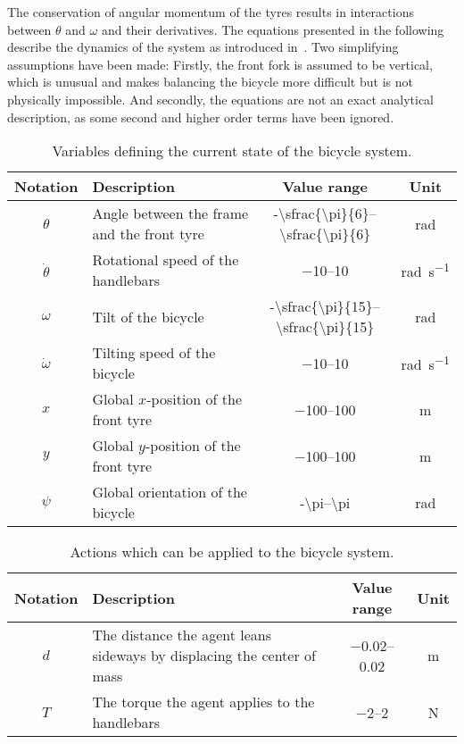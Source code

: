 The conservation of angular momentum of the tyres results in interactions between $\theta$ and $\omega$ and their derivatives.
The equations presented in the following describe the dynamics of the system as introduced in~\cite{randlov_learning_1998}.
Two simplifying assumptions have been made:
Firstly, the front fork is assumed to be vertical, which is unusual and makes balancing the bicycle more difficult but is not physically impossible.
And secondly, the equations are not an exact analytical description, as some second and higher order terms have been ignored.
\begin{table}[p]
    \centering
    \caption{Variables defining the current state of the bicycle system.}
    \label{tab:bicycle_variables}
    \begin{tabularx}{\tablewidth}{cXcc}
        \toprule
        Notation & Description & Value range & Unit \\
        \midrule
        $\theta$ & Angle between the frame and the front tyre & \numrange[parse-numbers=false]{-\sfrac{\pi}{6}}{\sfrac{\pi}{6}} & \si{\radian} \\
        $\dot{\theta}$ & Rotational speed of the handlebars & \numrange{-10}{10} & \si{\radian\per\second} \\
        $\omega$ & Tilt of the bicycle & \numrange[parse-numbers=false]{-\sfrac{\pi}{15}}{\sfrac{\pi}{15}} & \si{\radian} \\
        $\dot{\omega}$ & Tilting speed of the bicycle & \numrange{-10}{10} & \si{\radian\per\second} \\
        $x$ & Global $x$-position of the front tyre & \numrange{-100}{100} & \si{\metre} \\
        $y$ & Global $y$-position of the front tyre & \numrange{-100}{100} & \si{\metre} \\
        $\psi$ & Global orientation of the bicycle & \numrange[parse-numbers=false]{-\pi}{\pi} & \si{\radian} \\
        \bottomrule
    \end{tabularx}
\end{table}
\begin{table}[p]
    \centering
    \caption{Actions which can be applied to the bicycle system.}
    \label{tab:bicycle_actions}
    \begin{tabularx}{\tablewidth}{cXcc}
        \toprule
        Notation & Description & Value range & Unit \\
        \midrule
        $d$ & The distance the agent leans sideways by displacing the center of mass & \numrange{-0.02}{0.02} & \si{\metre} \\
        $T$ & The torque the agent applies to the handlebars & \numrange{-2}{2} & \si{\N} \\
        \bottomrule
    \end{tabularx}
\end{table}
